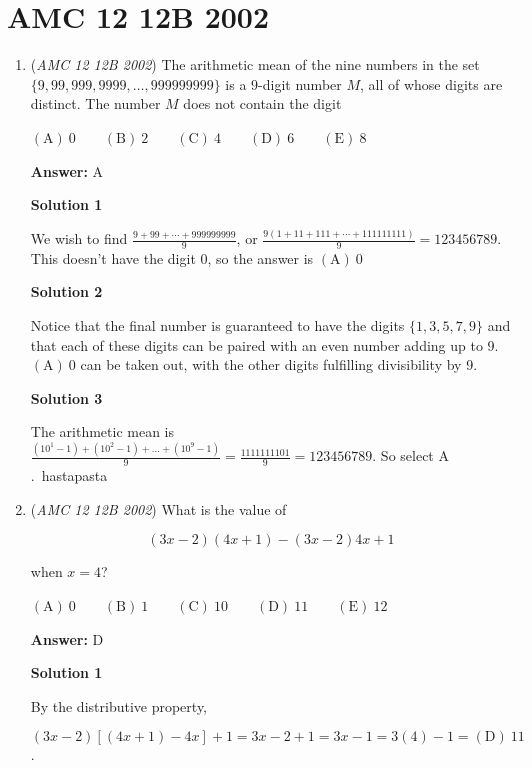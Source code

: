 \section{AMC 12 12B 2002}
        \begin{enumerate}
        	\item (\textit{AMC 12 12B 2002}) The arithmetic mean of the nine numbers in the set $\{9, 99, 999, 9999, \ldots, 999999999\}$ is a $9$-digit number $M$, all of whose digits are distinct. The number $M$ does not contain the digit


 $\mathrm{(A)}\ 0 \qquad\mathrm{(B)}\ 2 \qquad\mathrm{(C)}\ 4 \qquad\mathrm{(D)}\ 6 \qquad\mathrm{(E)}\ 8$

 \textbf{Answer: }A



\textbf{Solution 1}

We wish to find $\frac{9+99+\cdots +999999999}{9}$, or $\frac{9(1+11+111+\cdots +111111111)}{9}=123456789$. This doesn't have the digit 0, so the answer is $\boxed{\mathrm{(A)}\ 0}$




\textbf{Solution 2}

Notice that the final number is guaranteed to have the digits $\{1, 3, 5, 7, 9\}$ and that each of these digits can be paired with an even number adding up to 9. $\boxed{\mathrm{(A)}\ 0}$ can be taken out, with the other digits fulfilling divisibility by 9.

 



\textbf{Solution 3}

The arithmetic mean is $\frac{(10^1-1)+(10^2-1)+\ldots+(10^9-1)}{9}=\frac{1111111101}{9}=123456789$. So select $\boxed{\mathrm{A}}$.~hastapasta

 


	\item (\textit{AMC 12 12B 2002}) What is the value of 

 \[(3x - 2)(4x + 1) - (3x - 2)4x + 1\]


 when $x=4$?


 $\mathrm{(A)}\ 0 \qquad\mathrm{(B)}\ 1 \qquad\mathrm{(C)}\ 10 \qquad\mathrm{(D)}\ 11 \qquad\mathrm{(E)}\ 12$

 \textbf{Answer: }D



\textbf{Solution 1}

By the distributive property, 

 
 \[(3x-2)[(4x+1)-4x] + 1 = 3x-2 + 1 = 3x-1 = 3(4) - 1 = \boxed{\mathrm{(D)}\ 11}\].


\end{enumerate}
